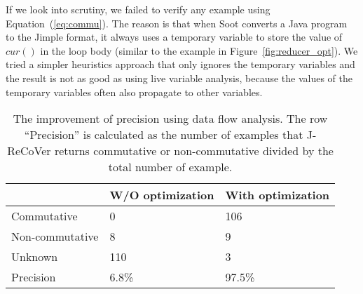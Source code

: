\documentclass{llncs}
\newcommand{\cur}{cur()}
\begin{document}
If we look into scrutiny, we failed to verify any example using Equation~(\ref{eq:commu}). The reason is that when Soot converts a Java program to the Jimple format, it always uses a temporary variable to store the value of $\cur$ in the loop body (similar to the example in Figure~\ref{fig:reducer_opt}). We tried a simpler heuristics approach that only ignores the temporary variables and the result is not as good as using live variable analysis, because the values of the temporary variables often also propagate to other variables.
\begin{table}[htb]
	\centering
	\begin{tabular}{|l|l|l|}
		\hline
		&W/O optimization	& With optimization\\
		\hline
		\hline
		Commutative& 0&106\\
		\hline
		Non-commutative&8&9\\
		\hline
		Unknown&110&3\\
		\hline
		Precision& 6.8\% & 97.5\%\\
		\hline
		
	\end{tabular}
	\caption{The improvement of precision using data flow analysis. The row ``Precision'' is calculated as the number of examples that J-ReCoVer returns commutative or non-commutative divided by the total number of example.}
	\label{tab:opt1}
\end{table}





\end{document}
